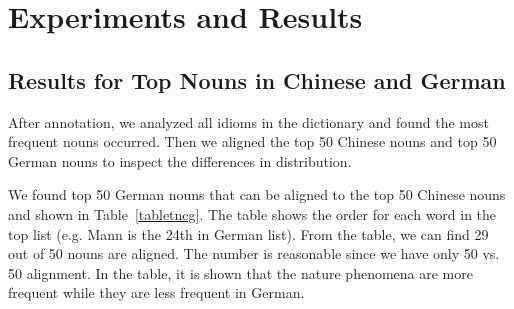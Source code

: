 \section{Experiments and Results}\label{nouns}

\subsection{Results for Top Nouns in Chinese and German}\label{firstresult}
After annotation, we analyzed all idioms in the dictionary and found the most frequent nouns occurred. Then we aligned the top 50 Chinese nouns and top 50 German nouns to inspect the differences in distribution. 

We found top 50 German nouns that can be aligned to the top 50 Chinese nouns and shown in Table~\ref{tabletncg}. The table shows the order for each word in the top list (e.g. Mann is the 24th in German list). From the table, we can find 29 out of 50 nouns are aligned. The number is reasonable since we have only 50 vs. 50 alignment. In the table, it is shown that the nature phenomena are more frequent while they are less frequent in German. 


